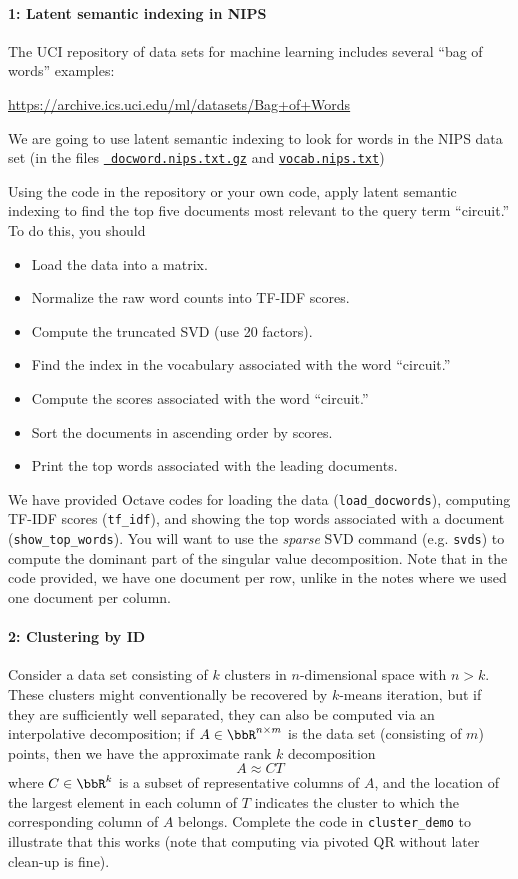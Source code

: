 \documentclass[12pt, leqno]{article} %
\begin{document}

\paragraph*{1: Latent semantic indexing in NIPS}
The UCI repository of data sets for machine learning includes several
``bag of words'' examples:
\begin{center}
  \url{https://archive.ics.uci.edu/ml/datasets/Bag+of+Words}
\end{center}
We are going to use latent semantic indexing to look for words in the
NIPS data set (in the files
\href{https://archive.ics.uci.edu/ml/machine-learning-databases/bag-of-words/docword.nips.txt.gz}{\tt
  docword.nips.txt.gz} and
\href{https://archive.ics.uci.edu/ml/machine-learning-databases/bag-of-words/vocab.nips.txt}{\tt vocab.nips.txt})

Using the code in the repository or your own code, apply latent
semantic indexing to find the top five documents most relevant to the
query term ``circuit.''  To do this, you should
\begin{itemize}
\item Load the data into a matrix.
\item Normalize the raw word counts into TF-IDF scores.
\item Compute the truncated SVD (use 20 factors).
\item Find the index in the vocabulary associated with the word ``circuit.''
\item Compute the scores associated with the word ``circuit.''
\item Sort the documents in ascending order by scores.
\item Print the top words associated with the leading documents.
\end{itemize}
We have provided Octave codes for loading the data ({\tt load\_docwords}),
computing TF-IDF scores ({\tt tf\_idf}), and showing the top words
associated with a document ({\tt show\_top\_words}).  You will want
to use the {\em sparse} SVD command (e.g. {\tt svds}) to compute the
dominant part of the singular value decomposition.  Note that in the
code provided, we have one document per row, unlike in the notes where
we used one document per column.


\paragraph*{2: Clustering by ID}
Consider a data set consisting of $k$ clusters in $n$-dimensional
space with $n > k$.  These clusters might conventionally be recovered
by $k$-means iteration, but if they are sufficiently well separated,
they can also be computed via an interpolative decomposition; if
$A \in \bbR^{n \times m}$ is the data set (consisting of $m$) points,
then we have the approximate rank $k$ decomposition
\[
  A \approx C T
\]
where $C \in \bbR^k$ is a subset of representative columns of $A$,
and the location of the largest element in each column of $T$ indicates the
cluster to which the corresponding column of $A$ belongs.  Complete
the code in {\tt cluster\_demo} to illustrate that this works (note
that computing via pivoted QR without later clean-up is fine).
\end{document}
